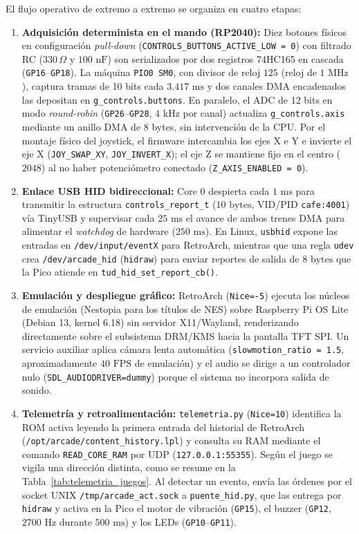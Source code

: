 El flujo operativo de extremo a extremo se organiza en cuatro etapas:
\begin{enumerate}
	\item \textbf{Adquisición determinista en el mando (RP2040):} Diez botones físicos en configuración \textit{pull-down} (\texttt{CONTROLS\_BUTTONS\_ACTIVE\_LOW = 0}) con filtrado RC ($330\,\Omega$ y $100\text{ nF}$) son serializados por dos registros 74HC165 en cascada (\texttt{GP16}--\texttt{GP18}). La máquina \texttt{PIO0 SM0}, con divisor de reloj $125$ (reloj de $1\text{ MHz}$), captura tramas de 10 bits cada $3.417\text{ ms}$ y dos canales DMA encadenados las depositan en \texttt{g\_controls.buttons}. En paralelo, el ADC de 12 bits en modo \textit{round-robin} (\texttt{GP26}--\texttt{GP28}, $4\text{ kHz}$ por canal) actualiza \texttt{g\_controls.axis} mediante un anillo DMA de 8 bytes, sin intervención de la CPU. Por el montaje físico del joystick, el firmware intercambia los ejes X e Y e invierte el eje X (\texttt{JOY\_SWAP\_XY}, \texttt{JOY\_INVERT\_X}); el eje Z se mantiene fijo en el centro ($2048$) al no haber potenciómetro conectado (\texttt{Z\_AXIS\_ENABLED = 0}).
	\item \textbf{Enlace USB HID bidireccional:} Core 0 despierta cada $1\text{ ms}$ para transmitir la estructura \texttt{controls\_report\_t} ($10\text{ bytes}$, VID/PID \texttt{cafe:4001}) vía TinyUSB y supervisar cada $25\text{ ms}$ el avance de ambos trenes DMA para alimentar el \textit{watchdog} de hardware ($250\text{ ms}$). En Linux, \texttt{usbhid} expone las entradas en \texttt{/dev/input/eventX} para RetroArch, mientras que una regla \texttt{udev} crea \texttt{/dev/arcade\_hid} (\texttt{hidraw}) para enviar reportes de salida de $8\text{ bytes}$ que la Pico atiende en \texttt{tud\_hid\_set\_report\_cb()}.
	\item \textbf{Emulación y despliegue gráfico:} RetroArch (\texttt{Nice=-5}) ejecuta los núcleos de emulación (Nestopia para los títulos de NES) sobre Raspberry Pi OS Lite (Debian 13, kernel 6.18) sin servidor X11/Wayland, renderizando directamente sobre el subsistema DRM/KMS hacia la pantalla TFT SPI. Un servicio auxiliar aplica cámara lenta automática (\texttt{slowmotion\_ratio = 1.5}, aproximadamente $40\text{ FPS}$ de emulación) y el audio se dirige a un controlador nulo (\texttt{SDL\_AUDIODRIVER=dummy}) porque el sistema no incorpora salida de sonido.
	\item \textbf{Telemetría y retroalimentación:} \texttt{telemetria.py} (\texttt{Nice=10}) identifica la ROM activa leyendo la primera entrada del historial de RetroArch (\texttt{/opt/arcade/content\_history.lpl}) y consulta su RAM mediante el comando \texttt{READ\_CORE\_RAM} por UDP (\texttt{127.0.0.1:55355}). Según el juego se vigila una dirección distinta, como se resume en la Tabla~\ref{tab:telemetria_juegos}. Al detectar un evento, envía las órdenes por el socket UNIX \texttt{/tmp/arcade\_act.sock} a \texttt{puente\_hid.py}, que las entrega por \texttt{hidraw} y activa en la Pico el motor de vibración (\texttt{GP15}), el buzzer (\texttt{GP12}, $2700\text{ Hz}$ durante $500\text{ ms}$) y los LEDs (\texttt{GP10}--\texttt{GP11}).
\end{enumerate}

